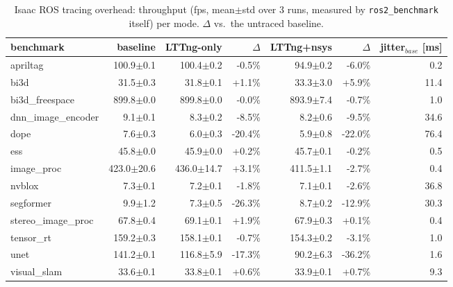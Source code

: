 \begin{table}[t]\centering\small
\caption{Isaac ROS tracing overhead: throughput (fps, mean$\pm$std over 3 runs, measured by \texttt{ros2\_benchmark} itself) per mode. $\Delta$ vs.\ the untraced baseline.}\label{tab:isaac-overhead}
\begin{tabular}{lrrrrrr}
\toprule
benchmark & baseline & LTTng-only & $\Delta$ & LTTng+nsys & $\Delta$ & jitter$_{base}$ [ms] \\
\midrule
apriltag & 100.9$\pm$0.1 & 100.4$\pm$0.2 & -0.5\% & 94.9$\pm$0.2 & -6.0\% & 0.2 \\
bi3d & 31.5$\pm$0.3 & 31.8$\pm$0.1 & +1.1\% & 33.3$\pm$3.0 & +5.9\% & 11.4 \\
bi3d\_freespace & 899.8$\pm$0.0 & 899.8$\pm$0.0 & -0.0\% & 893.9$\pm$7.4 & -0.7\% & 1.0 \\
dnn\_image\_encoder & 9.1$\pm$0.1 & 8.3$\pm$0.2 & -8.5\% & 8.2$\pm$0.6 & -9.5\% & 34.6 \\
dope & 7.6$\pm$0.3 & 6.0$\pm$0.3 & -20.4\% & 5.9$\pm$0.8 & -22.0\% & 76.4 \\
ess & 45.8$\pm$0.0 & 45.9$\pm$0.0 & +0.2\% & 45.7$\pm$0.1 & -0.2\% & 0.5 \\
image\_proc & 423.0$\pm$20.6 & 436.0$\pm$14.7 & +3.1\% & 411.5$\pm$1.1 & -2.7\% & 0.4 \\
nvblox & 7.3$\pm$0.1 & 7.2$\pm$0.1 & -1.8\% & 7.1$\pm$0.1 & -2.6\% & 36.8 \\
segformer & 9.9$\pm$1.2 & 7.3$\pm$0.5 & -26.3\% & 8.7$\pm$0.2 & -12.9\% & 30.3 \\
stereo\_image\_proc & 67.8$\pm$0.4 & 69.1$\pm$0.1 & +1.9\% & 67.9$\pm$0.3 & +0.1\% & 0.4 \\
tensor\_rt & 159.2$\pm$0.3 & 158.1$\pm$0.1 & -0.7\% & 154.3$\pm$0.2 & -3.1\% & 1.0 \\
unet & 141.2$\pm$0.1 & 116.8$\pm$5.9 & -17.3\% & 90.2$\pm$6.3 & -36.2\% & 1.6 \\
visual\_slam & 33.6$\pm$0.1 & 33.8$\pm$0.1 & +0.6\% & 33.9$\pm$0.1 & +0.7\% & 9.3 \\
\bottomrule
\end{tabular}
\end{table}

